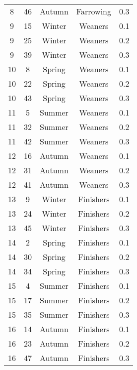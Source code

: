 \begin{table}[]
\begin{tabular}{ccccc}
8                   & 46     & Autumn & Farrowing & 0.3    \\
9                   & 15     & Winter & Weaners   & 0.1    \\
9                   & 25     & Winter & Weaners   & 0.2    \\
9                   & 39     & Winter & Weaners   & 0.3    \\
10                  & 8      & Spring & Weaners   & 0.1    \\
10                  & 22     & Spring & Weaners   & 0.2    \\
10                  & 43     & Spring & Weaners   & 0.3    \\
11                  & 5      & Summer & Weaners   & 0.1    \\
11                  & 32     & Summer & Weaners   & 0.2    \\
11                  & 42     & Summer & Weaners   & 0.3    \\
12                  & 16     & Autumn & Weaners   & 0.1    \\
12                  & 31     & Autumn & Weaners   & 0.2    \\
12                  & 41     & Autumn & Weaners   & 0.3    \\
13                  & 9      & Winter & Finishers & 0.1    \\
13                  & 24     & Winter & Finishers & 0.2    \\
13                  & 45     & Winter & Finishers & 0.3    \\
14                  & 2      & Spring & Finishers & 0.1    \\
14                  & 30     & Spring & Finishers & 0.2    \\
14                  & 34     & Spring & Finishers & 0.3    \\
15                  & 4      & Summer & Finishers & 0.1    \\
15                  & 17     & Summer & Finishers & 0.2    \\
15                  & 35     & Summer & Finishers & 0.3    \\
16                  & 14     & Autumn & Finishers & 0.1    \\
16                  & 23     & Autumn & Finishers & 0.2    \\
16                  & 47     & Autumn & Finishers & 0.3   
\end{tabular}
\end{table}